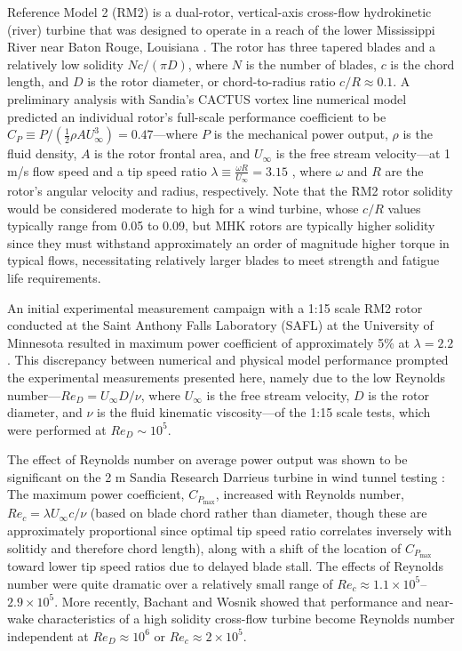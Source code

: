 \documentclass[10pt,letterpaper]{article}
\begin{document}
Reference Model 2 (RM2) is a dual-rotor, vertical-axis cross-flow hydrokinetic
(river) turbine that was designed to operate in a reach of the lower Mississippi
River near Baton Rouge, Louisiana \cite{Barone2011, Neary2011}. The rotor has
three tapered blades and a relatively low solidity $Nc/(\pi D)$, where $N$ is
the number of blades, $c$ is the chord length, and $D$ is the rotor diameter, or
chord-to-radius ratio $c/R \approx 0.1$. A preliminary analysis with Sandia's
CACTUS vortex line numerical model \cite{Murray2011} predicted an individual
rotor's full-scale performance coefficient to be $C_P \equiv P / \left(
\frac{1}{2} \rho A U_\infty^3 \right) = 0.47$---where $P$ is the mechanical
power output, $\rho$ is the fluid density, $A$ is the rotor frontal area, and
$U_\infty$ is the free stream velocity---at 1 m/s flow speed and a tip speed
ratio $\lambda \equiv \frac{\omega R}{U_\infty} = 3.15$ \cite{Barone2011}, where
$\omega$ and $R$ are the rotor's angular velocity and radius, respectively. Note
that the RM2 rotor solidity would be considered moderate to high for a wind
turbine, whose $c/R$ values typically range from 0.05 to 0.09, but MHK rotors
are typically higher solidity since they must withstand approximately an order
of magnitude higher torque in typical flows, necessitating relatively larger
blades to meet strength and fatigue life requirements.

An initial experimental measurement campaign with a 1:15 scale RM2 rotor
conducted at the Saint Anthony Falls Laboratory (SAFL) at the University of
Minnesota resulted in maximum power coefficient of approximately 5\% at $\lambda
= 2.2$ \cite{Hill2014}. This discrepancy between numerical and physical model
performance prompted the experimental measurements presented here, namely due to
the low Reynolds number---$Re_D = U_\infty D / \nu$, where $U_\infty$ is the
free stream velocity, $D$ is the rotor diameter, and $\nu$ is the fluid
kinematic viscosity---of the 1:15 scale tests, which were performed at $Re_D
\sim 10^5$.

The effect of Reynolds number on average power output was shown to be
significant on the 2 m Sandia Research Darrieus turbine in wind tunnel testing
\cite{Blackwell1976}: The maximum power coefficient, $C_{P_{\max}}$, increased
with Reynolds number, $Re_c=\lambda U_\infty c / \nu$ (based on blade chord
rather than diameter, though these are approximately proportional since optimal
tip speed ratio correlates inversely with solitidy and therefore chord length),
along with a shift of the location of $C_{P_{\max}}$ toward lower tip speed
ratios due to delayed blade stall. The effects of Reynolds number were quite
dramatic over a relatively small range of $Re_c \approx 1.1 \times 10^5$--$2.9
\times 10^5$. More recently, Bachant and Wosnik \cite{Bachant2014,
    Bachant2016-RVAT-Re-dep} showed that performance and near-wake characteristics
of a high solidity cross-flow turbine become Reynolds number independent at
$Re_D \approx 10^6$ or $Re_c \approx 2 \times 10^5$.
\end{document}
